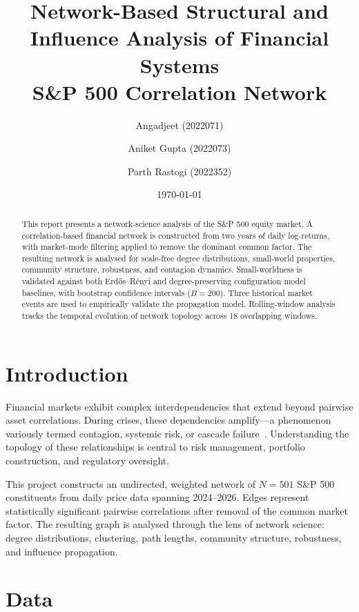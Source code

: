 \documentclass[11pt, a4paper]{article}
\title{\Huge \textbf{Network-Based Structural and Influence Analysis of Financial Systems} \\
\vspace{0.3cm}
\Large S\&P 500 Correlation Network}
\author{Angadjeet (2022071) \and Aniket Gupta (2022073) \and Parth Rastogi (2022352)}
\date{\today}
\begin{document}
\maketitle

\begin{abstract}
\noindent This report presents a network-science analysis of the S\&P 500 equity market. A correlation-based financial network is constructed from two years of daily log-returns, with market-mode filtering applied to remove the dominant common factor. The resulting network is analysed for scale-free degree distributions, small-world properties, community structure, robustness, and contagion dynamics. Small-worldness is validated against both Erd\H{o}s--R\'enyi and degree-preserving configuration model baselines, with bootstrap confidence intervals ($B=200$). Three historical market events are used to empirically validate the propagation model. Rolling-window analysis tracks the temporal evolution of network topology across 18 overlapping windows.
\end{abstract}

\newpage
\tableofcontents
\newpage

\section{Introduction}

Financial markets exhibit complex interdependencies that extend beyond pairwise asset correlations. During crises, these dependencies amplify---a phenomenon variously termed contagion, systemic risk, or cascade failure~\citep{barabasi2016network}. Understanding the topology of these relationships is central to risk management, portfolio construction, and regulatory oversight.

This project constructs an undirected, weighted network of $N=501$ S\&P 500 constituents from daily price data spanning 2024--2026. Edges represent statistically significant pairwise correlations after removal of the common market factor. The resulting graph is analysed through the lens of network science: degree distributions, clustering, path lengths, community structure, robustness, and influence propagation.

\section{Data}
\end{document}
